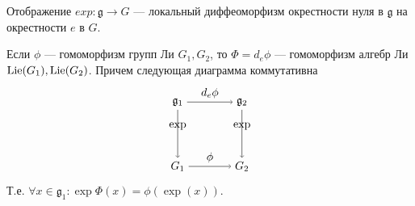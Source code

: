 \begin{ass}
Отображение $exp:\mathfrak{g}\to G$ — локальный диффеоморфизм окрестности нуля в $\mathfrak{g}$ на окрестности $e$ в $G$.
\end{ass}

\begin{thm}
Если $\phi$ — гомоморфизм групп Ли $G_1,G_2$, то $\Phi=d_e\phi$ — гомоморфизм алгебр Ли $\operatorname{Lie}(G_1),\operatorname{Lie}(G_2)$. Причем следующая диаграмма коммутативна
  $$\begin{tikzpicture}
    \node (A) at (0,0) {$G_1$};
    \node (B) at (2,0) {$G_2$};
    \node (C) at (0,2) {$\mathfrak{g}_1$};
    \node (D) at (2,2) {$\mathfrak{g}_2$};
    \path [->] (A) edge [above] node {$\phi$} (B);
    \path [->] (C) edge [above] node {$d_e\phi$} (D);
    \path [->] (C) edge [above] node {$\exp$} (A);
    \path [->] (D) edge [above] node {$\exp$} (B);
  \end{tikzpicture}$$
  Т.е. $\forall x\in \mathfrak{g}_1:\exp\Phi(x)=\phi(\exp(x))$.
\end{thm}

